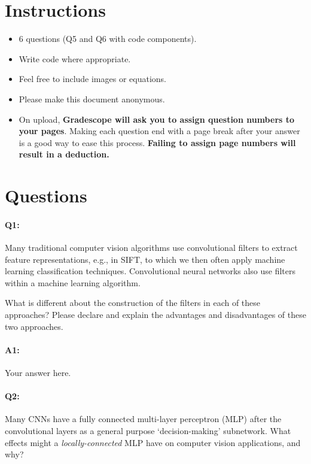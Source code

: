 \section*{Instructions}
\begin{itemize}
  \item 6 questions (Q5 and Q6 with code components).
  \item Write code where appropriate.
  \item Feel free to include images or equations.
  \item Please make this document anonymous.
  \item On upload, \textbf{Gradescope will ask you to assign question numbers to your pages}. Making each question end with a page break after your answer is a good way to ease this process. \textbf{Failing to assign page numbers will result in a deduction.}
\end{itemize}

\section*{Questions}


\paragraph{Q1:} Many traditional computer vision algorithms use convolutional filters to extract feature representations, e.g., in SIFT, to which we then often apply machine learning classification techniques. Convolutional neural networks also use filters within a machine learning algorithm.

What is different about the construction of the filters in each of these approaches? Please declare and explain the advantages and disadvantages of these two approaches.

\paragraph{A1:} Your answer here.


\pagebreak
\paragraph{Q2:} Many CNNs have a fully connected multi-layer perceptron (MLP) after the convolutional layers as a general purpose `decision-making' subnetwork. What effects might a \emph{locally-connected} MLP have on computer vision applications, and why? 

